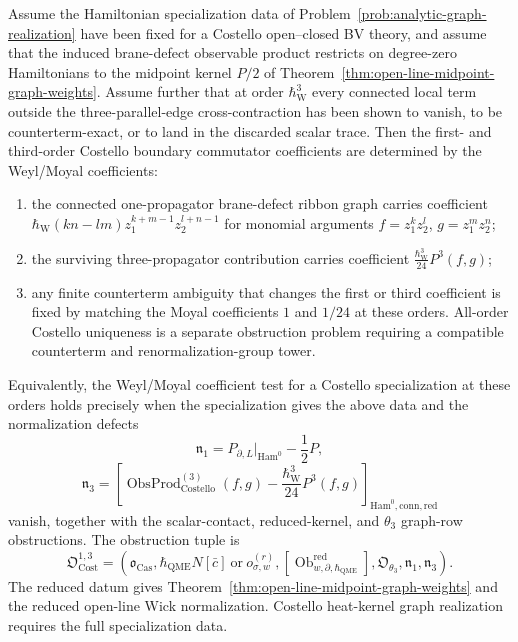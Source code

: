 \documentclass[11pt]{memoir}
\begin{document}
\begin{thm}\label{thm:first-third-costello-normalizations}
  Assume the Hamiltonian specialization data of
	  Problem~\ref{prob:analytic-graph-realization} have been fixed for a
  Costello open--closed BV theory, and assume that the induced
  brane-defect observable product restricts on degree-zero Hamiltonians to the
  midpoint kernel $P/2$ of
  Theorem~\ref{thm:open-line-midpoint-graph-weights}. Assume further that
  at order \(\hbar_{\mathrm{W}}^3\) every connected local term outside the
  three-parallel-edge cross-contraction has been shown to vanish, to be
  counterterm-exact, or to land in the discarded scalar trace. Then the first-
  and third-order Costello boundary commutator coefficients are determined by
  the Weyl/Moyal coefficients:
  \begin{enumerate}
    \item the connected one-propagator brane-defect ribbon graph carries
		      coefficient \(\hbar_{\mathrm{W}}(kn-lm)z_1^{k+m-1}z_2^{l+n-1}\) for monomial arguments
      $f=z_1^kz_2^l$, $g=z_1^mz_2^n$;
    \item the surviving three-propagator contribution carries coefficient
      \(\frac{\hbar_{\mathrm{W}}^3}{24}P^3(f,g)\);
    \item any finite counterterm ambiguity that changes the first or third
	      coefficient is fixed by matching the Moyal coefficients $1$ and
	      $1/24$ at these orders.  All-order Costello uniqueness is a
	      separate obstruction problem requiring a compatible counterterm
	      and renormalization-group tower.
  \end{enumerate}
  Equivalently, the Weyl/Moyal coefficient test for a Costello specialization
  at these orders holds precisely
  when the specialization gives the above data and the normalization
  defects
  \[
    \mathfrak n_1
    =
    P_{\partial,L}|_{\mathrm{Ham}^0}-\frac12P,
  \]
  \[
    \mathfrak n_3
    =
    \left[
      \operatorname{ObsProd}^{(3)}_{\mathrm{Costello}}(f,g)
	      -\frac{\hbar_{\mathrm{W}}^3}{24}P^3(f,g)
    \right]_{\mathrm{Ham}^0,\mathrm{conn},\mathrm{red}}
  \]
  vanish, together with the scalar-contact, reduced-kernel, and
  \(\theta_3\) graph-row obstructions.  The obstruction tuple is
  \[
    \mathfrak O_{\mathrm{Cost}}^{1,3}
    =
    (\mathfrak o_{\mathrm{Cas}},
     \hbar_{\mathrm{QME}}N[\bar c]\ \text{or}\ o_{\sigma,w}^{(r)},
     [\operatorname{Ob}^{\mathrm{red}}_{w,\partial,\hbar_{\mathrm{QME}}}],
     \mathfrak O_{\theta_3},
     \mathfrak n_1,
     \mathfrak n_3).
  \]
  The reduced datum gives Theorem~\ref{thm:open-line-midpoint-graph-weights}
  and the reduced open-line Wick normalization. Costello heat-kernel graph
  realization requires the full specialization data.
\end{thm}
\end{document}
